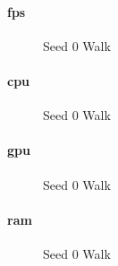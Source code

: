 




\paragraph{\ac{fps}}
\begin{figure}[!htbp]
	\caption{Seed 0 Walk}\label{fig:seed-0-walk-fps}
\end{figure}

\paragraph{\ac{cpu}}
\begin{figure}[!htbp]
	\caption{Seed 0 Walk}\label{fig:seed-0-walk-cpu}
\end{figure}

\paragraph{\ac{gpu}}
\begin{figure}[!htbp]
	\caption{Seed 0 Walk}\label{fig:seed-0-walk-gpu}
\end{figure}

\paragraph{\ac{ram}}
\begin{figure}[!htbp]
	\caption{Seed 0 Walk}\label{fig:seed-0-walk-mem}
\end{figure} 


